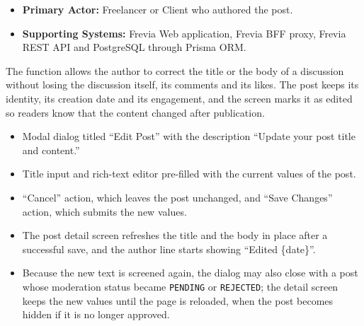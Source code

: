 
\begin{itemize}[leftmargin=1.6em,topsep=3pt,itemsep=2pt,parsep=0pt,label=$\bullet$]
      \item \textbf{Primary Actor:} Freelancer or Client who authored the post.
      \item \textbf{Supporting Systems:} Frevia Web application, Frevia BFF proxy, Frevia REST API
            and PostgreSQL through Prisma ORM.
\end{itemize}

\noindent The function allows the author to correct the title or the body of a discussion without
losing the discussion itself, its comments and its likes. The post keeps its identity, its
creation date and its engagement, and the screen marks it as edited so readers know that the
content changed after publication.

\begin{itemize}[leftmargin=1.6em,topsep=3pt,itemsep=2pt,parsep=0pt,label=$\bullet$]
      \item Modal dialog titled ``Edit Post'' with the description ``Update your post title
            and content.''
      \item Title input and rich-text editor pre-filled with the current values of the
            post.
      \item ``Cancel'' action, which leaves the post unchanged, and ``Save Changes'' action, which
            submits the new values.
      \item The post detail screen refreshes the title and the body in place after a
            successful save, and the author line starts showing ``Edited \{date\}''.
      \item Because the new text is screened again, the dialog may also close with a post
            whose moderation status became \texttt{PENDING} or \texttt{REJECTED}; the
            detail screen keeps the new values until the page is reloaded, when the post
            becomes hidden if it is no longer approved.
\end{itemize}

